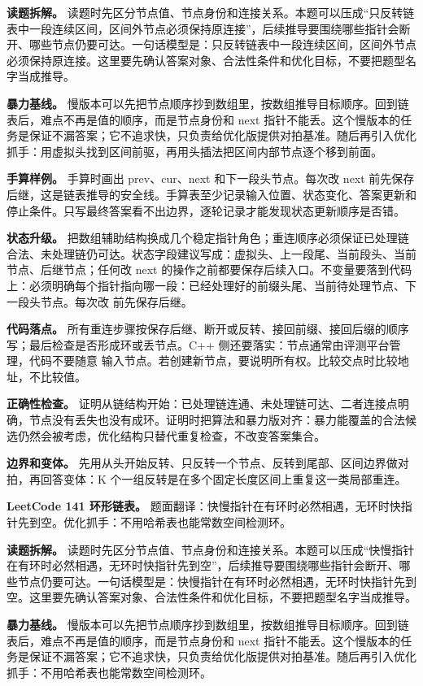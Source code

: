 \textbf{读题拆解。} 读题时先区分节点值、节点身份和连接关系。本题可以压成“只反转链表中一段连续区间，区间外节点必须保持原连接”，后续推导要围绕哪些指针会断开、哪些节点仍要可达。一句话模型是：只反转链表中一段连续区间，区间外节点必须保持原连接。这里要先确认答案对象、合法性条件和优化目标，不要把题型名字当成推导。

\textbf{暴力基线。} 慢版本可以先把节点顺序抄到数组里，按数组推导目标顺序。回到链表后，难点不再是值的顺序，而是节点身份和 next 指针不能丢。这个慢版本的任务是保证不漏答案；它不追求快，只负责给优化版提供对拍基准。随后再引入优化抓手：用虚拟头找到区间前驱，再用头插法把区间内部节点逐个移到前面。

\textbf{手算样例。} 手算时画出 prev、cur、next 和下一段头节点。每次改 next 前先保存后继，这是链表推导的安全线。手算表至少记录输入位置、状态变化、答案更新和停止条件。只写最终答案看不出边界，逐轮记录才能发现状态更新顺序是否错。

\textbf{状态升级。} 把数组辅助结构换成几个稳定指针角色；重连顺序必须保证已处理链合法、未处理链仍可达。状态字段建议写成：虚拟头、上一段尾、当前段头、当前节点、后继节点；任何改 next 的操作之前都要保存后续入口。不变量要落到代码上：必须明确每个指针指向哪一段：已经处理好的前缀头尾、当前待处理节点、下一段头节点。每次改  前先保存后继。

\textbf{代码落点。} 所有重连步骤按保存后继、断开或反转、接回前缀、接回后缀的顺序写；最后检查是否形成环或丢节点。C++ 侧还要落实：节点通常由评测平台管理，代码不要随意  输入节点。若创建新节点，要说明所有权。比较交点时比较地址，不比较值。

\textbf{正确性检查。} 证明从链结构开始：已处理链连通、未处理链可达、二者连接点明确，节点没有丢失也没有成环。证明时把算法和暴力版对齐：暴力能覆盖的合法候选仍然会被考虑，优化结构只替代重复检查，不改变答案集合。

\textbf{边界和变体。} 先用从头开始反转、只反转一个节点、反转到尾部、区间边界做对拍，再回答变体：K 个一组反转是在多个固定长度区间上重复这一类局部重连。

\noindent\textbf{LeetCode 141 环形链表。} 题面翻译：快慢指针在有环时必然相遇，无环时快指针先到空。优化抓手：不用哈希表也能常数空间检测环。

\textbf{读题拆解。} 读题时先区分节点值、节点身份和连接关系。本题可以压成“快慢指针在有环时必然相遇，无环时快指针先到空”，后续推导要围绕哪些指针会断开、哪些节点仍要可达。一句话模型是：快慢指针在有环时必然相遇，无环时快指针先到空。这里要先确认答案对象、合法性条件和优化目标，不要把题型名字当成推导。

\textbf{暴力基线。} 慢版本可以先把节点顺序抄到数组里，按数组推导目标顺序。回到链表后，难点不再是值的顺序，而是节点身份和 next 指针不能丢。这个慢版本的任务是保证不漏答案；它不追求快，只负责给优化版提供对拍基准。随后再引入优化抓手：不用哈希表也能常数空间检测环。

